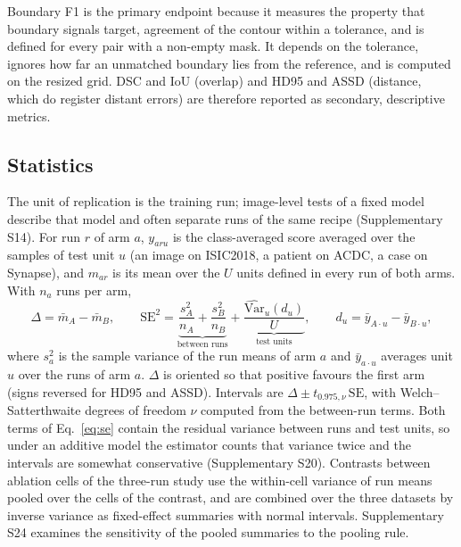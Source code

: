\documentclass[fleqn,10pt,lineno]{wlpeerj}
\begin{document}
Boundary F1 is the primary endpoint because it measures the property that boundary signals target, agreement of the contour within a tolerance, and is defined for every pair with a non-empty mask. It depends on the tolerance, ignores how far an unmatched boundary lies from the reference, and is computed on the resized grid. DSC and IoU (overlap) and HD95 and ASSD (distance, which do register distant errors) are therefore reported as secondary, descriptive metrics.

\subsection*{Statistics}
The unit of replication is the training run; image-level tests of a fixed model describe that model and often separate runs of the same recipe (Supplementary S14). For run $r$ of arm $a$, $y_{aru}$ is the class-averaged score averaged over the samples of test unit $u$ (an image on ISIC2018, a patient on ACDC, a case on Synapse), and $m_{ar}$ is its mean over the $U$ units defined in every run of both arms. With $n_a$ runs per arm,
\begin{equation}
\Delta=\bar m_A-\bar m_B,\qquad
\mathrm{SE}^2=\underbrace{\frac{s_A^2}{n_A}+\frac{s_B^2}{n_B}}_{\text{between runs}}+\underbrace{\frac{\widehat{\mathrm{Var}}_u(d_u)}{U}}_{\text{test units}},\qquad
d_u=\bar y_{A\cdot u}-\bar y_{B\cdot u},
\label{eq:se}
\end{equation}
where $s_a^2$ is the sample variance of the run means of arm $a$ and $\bar y_{a\cdot u}$ averages unit $u$ over the runs of arm $a$. $\Delta$ is oriented so that positive favours the first arm (signs reversed for HD95 and ASSD). Intervals are $\Delta\pm t_{0.975,\nu}\,\mathrm{SE}$, with Welch--Satterthwaite degrees of freedom $\nu$ computed from the between-run terms. Both terms of Eq.~\ref{eq:se} contain the residual variance between runs and test units, so under an additive model the estimator counts that variance twice and the intervals are somewhat conservative (Supplementary S20). Contrasts between ablation cells of the three-run study use the within-cell variance of run means pooled over the cells of the contrast, and are combined over the three datasets by inverse variance as fixed-effect summaries with normal intervals. Supplementary S24 examines the sensitivity of the pooled summaries to the pooling rule.
\end{document}
